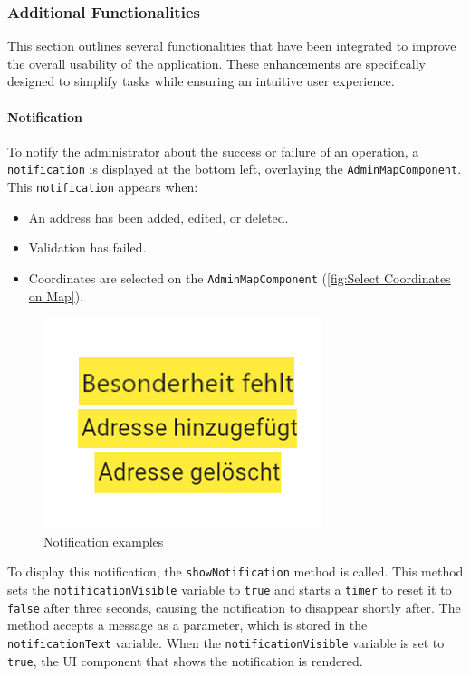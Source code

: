 \newpage


\subsubsection{Additional Functionalities}
    This section outlines several functionalities that have been integrated to improve the overall usability of the application. These enhancements are specifically designed to simplify tasks while ensuring an intuitive user experience.

\paragraph*{Notification}
\label{fig:Notification}

    To notify the administrator about the success or failure of an operation, a \texttt{notification} is displayed at the bottom left, overlaying the \texttt{AdminMapComponent}. This \texttt{notification} appears when:

    \begin{itemize}
        \item An address has been added, edited, or deleted.
        \item Validation has failed.
        \item Coordinates are selected on the \texttt{AdminMapComponent} (\ref{fig:Select Coordinates on Map}).
    \end{itemize}


\begin{figure}[H]
    \centering
    \includegraphics[width=0.4\linewidth]{images/AdminPanel/NotificationExamples.png}
    \caption{Notification examples}
\end{figure}

To display this notification, the \texttt{showNotification} method is called. This method sets the \texttt{notificationVisible} variable to \texttt{true} and starts a \texttt{timer} to reset it to \texttt{false} after three seconds, causing the notification to disappear shortly after. The method accepts a message as a parameter, which is stored in the \texttt{notificationText} variable. When the \texttt{notificationVisible} variable is set to \texttt{true}, the UI component that shows the notification is rendered.


